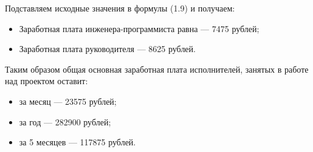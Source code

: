 \begin{par}
Подставляем исходные значения в формулы (1.9) и получаем:
\begin{itemize}
	\item{} Заработная плата инженера-программиста равна --- 7475 рублей;
	\item{} Заработная плата руководителя — 8625 рублей.
\end{itemize}
Таким образом общая основная заработная плата исполнителей, занятых в работе над проектом оставит:
\begin{itemize}
	\item{} за месяц --- 23575 рублей;
	\item{} за год --- 282900 рублей;
	\item{} за 5 месяцев --- 117875 рублей.
\end{itemize}
\end{par}
%
%
%
%
%
%
